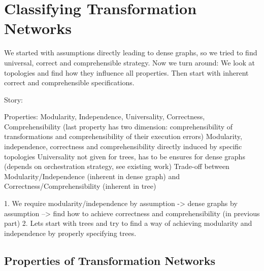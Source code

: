 \chapter{Classifying Transformation Networks
}
\label{chap:properties}

We started with assumptions directly leading to dense graphs, so we tried to find universal, correct and comprehensible strategy.
Now we turn around: We look at topologies and find how they influence all properties. Then start with inherent correct and comprehensible specifications.

Story:

Properties: Modularity, Independence, Universality, Correctness, Comprehensibility (last property has two dimension: comprehensibility of transformations and comprehensibility of their execution errors)
Modularity, independence, correctness and comprehensibility directly induced by specific topologies
Universality not given for trees, has to be ensures for dense graphs (depends on orchestration strategy, see existing work)
Trade-off between Modularity/Independence (inherent in dense graph) and Correctness/Comprehensibility (inherent in tree)

1. We require modularity/independence by assumption -> dense graphs by assumption --> find how to achieve correctness and comprehensibility (in previous part)
2. Lets start with trees and try to find a way of achieving modularity and independence by properly specifying trees.



\section{Properties of Transformation Networks}

